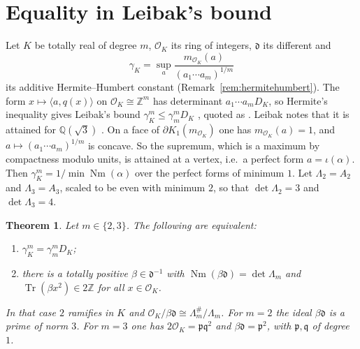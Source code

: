 \documentclass[11pt,reqno]{amsart}
\theoremstyle{plain}
\newtheorem{theorem}{Theorem}[section]
\theoremstyle{definition}
\newcommand{\Z}{\mathbb{Z}}
\newcommand{\Q}{\mathbb{Q}}
\newcommand{\Nm}{\operatorname{Nm}}
\newcommand{\Tr}{\operatorname{Tr}}
\newcommand{\bdy}{\partial}
\begin{document}
\section{Equality in Leibak's bound}\label{sec:leibak}

Let $K$ be totally real of degree $m$, $\mathcal O_K$ its ring of integers, $\mathfrak d$ its different and
\[
\gamma_K=\sup_a\frac{m_{\mathcal O_K}(a)}{(a_1\cdots a_m)^{1/m}}
\]
its additive Hermite--Humbert constant (Remark~\ref{rem:hermitehumbert}). The form
$x\mapsto\langle a,q(x)\rangle$ on $\mathcal O_K\cong\Z^m$ has determinant $a_1\cdots a_mD_K$, so Hermite's
inequality gives Leibak's bound $\gamma_K^m\le\gamma_m^mD_K$ \cite[Thm.~6]{Leibak}, quoted as
\cite[Thm.~2.2]{LeibakThesis}. Leibak notes that it is attained for $\Q(\sqrt3)$ \cite[after
Thm.~2.2]{LeibakThesis}. On a face of $\bdy K_1(m_{\mathcal O_K})$ one has $m_{\mathcal O_K}(a)=1$, and
$a\mapsto(a_1\cdots a_m)^{1/m}$ is concave. So the supremum, which is a maximum by compactness modulo
units, is attained at a vertex, i.e.\ a perfect form $a=\iota(\alpha)$. Then $\gamma_K^m=1/\min\Nm(\alpha)$
over the perfect forms of minimum $1$. Let $\Lambda_2=A_2$
and $\Lambda_3=A_3$, scaled to be even with minimum $2$, so that $\det\Lambda_2=3$ and $\det\Lambda_3=4$.

\begin{theorem}\label{thm:leibak}
Let $m\in\{2,3\}$. The following are equivalent:
\begin{enumerate}[label=\textup{(\roman*)},leftmargin=2.2em]
\item $\gamma_K^m=\gamma_m^mD_K$;
\item there is a totally positive $\beta\in\mathfrak d^{-1}$ with $\Nm(\beta\mathfrak d)=\det\Lambda_m$ and
$\Tr(\beta x^2)\in2\Z$ for all $x\in\mathcal O_K$.
\end{enumerate}
In that case $2$ ramifies in $K$ and $\mathcal O_K/\beta\mathfrak d\cong\Lambda_m^\#/\Lambda_m$. For $m=2$ the
ideal $\beta\mathfrak d$ is a prime of norm $3$. For $m=3$ one has $2\mathcal O_K=\mathfrak p\mathfrak q^2$ and
$\beta\mathfrak d=\mathfrak p^2$, with $\mathfrak p,\mathfrak q$ of degree~$1$.
\end{theorem}
\end{document}
